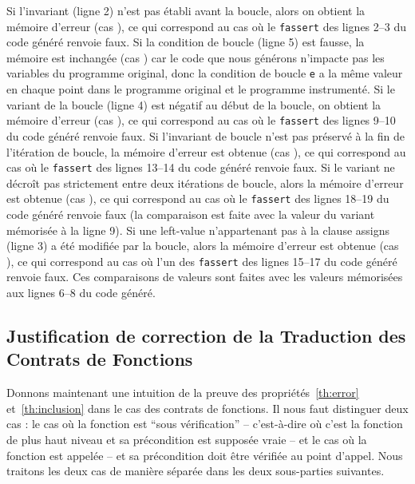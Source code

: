 Si l'invariant (ligne 2) n'est pas établi avant la boucle, alors on obtient
la mémoire d'erreur (cas ), ce qui correspond au cas où le
\lstinline'fassert' des lignes 2--3 du code généré renvoie faux.
Si la condition de boucle (ligne 5) est fausse, la mémoire est inchangée
(cas ) car le code que nous générons n'impacte pas les
variables du programme original, donc la condition de boucle \lstinline'e' a la
même valeur en chaque point dans le programme original et le programme
instrumenté.
Si le variant de la boucle (ligne 4) est négatif au début de la boucle, on
obtient la mémoire d'erreur (cas ), ce qui correspond au cas
où le \lstinline'fassert' des lignes 9--10 du code généré renvoie faux.
Si l'invariant de boucle n'est pas préservé à la fin de l'itération de boucle,
la mémoire d'erreur est obtenue (cas ), ce qui
correspond au cas où le \lstinline'fassert' des lignes 13--14 du code généré
renvoie faux.
Si le variant ne décroît pas strictement entre deux itérations de boucle, alors
la mémoire d'erreur est obtenue (cas ), ce qui
correspond au cas où le \lstinline'fassert' des lignes 18--19 du code généré
renvoie faux (la comparaison est faite avec la valeur du variant mémorisée à la
ligne 9).
Si une left-value n'appartenant pas à la clause assigns (ligne 3) a été modifiée
par la boucle, alors la mémoire d'erreur est obtenue (cas ),
ce qui correspond au cas où l'un des \lstinline'fassert' des lignes 15--17 du
code généré renvoie faux.
Ces comparaisons de valeurs sont faites avec les valeurs mémorisées aux lignes
6--8 du code généré.




\subsection{Justification de correction de la Traduction des Contrats de
  Fonctions}


Donnons maintenant une intuition de la preuve des propriétés~\ref{th:error}
et~\ref{th:inclusion} dans le cas des contrats de fonctions.
Il nous faut distinguer deux cas : le
cas où la fonction est ``sous vérification'' -- c'est-à-dire où c'est la
fonction de plus haut niveau et sa précondition est supposée vraie -- et le cas
où la fonction est appelée -- et sa précondition doit être vérifiée au point
d'appel.
Nous traitons les deux cas de manière séparée dans les deux sous-parties
suivantes.


